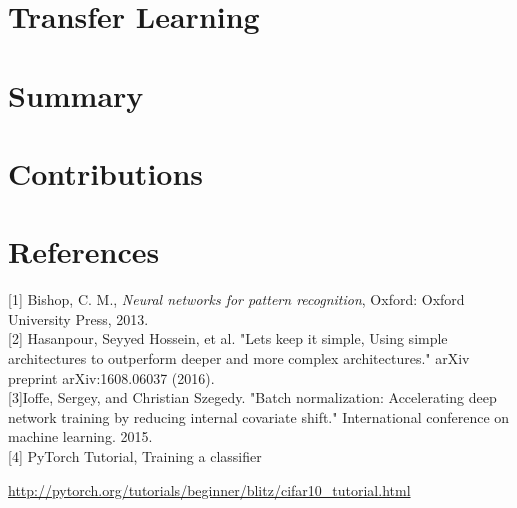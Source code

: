 \documentclass{article}
\begin{document}
\newpage
\section{Transfer Learning}

\newpage
\section{Summary}

\section{Contributions}



\section{References}
[1] Bishop, C. M., {\it Neural networks for pattern recognition}, Oxford: Oxford University Press, 2013. \\

[2] Hasanpour, Seyyed Hossein, et al. "Lets keep it simple, Using simple architectures to outperform deeper and more complex architectures." arXiv preprint arXiv:1608.06037 (2016). \\

[3]Ioffe, Sergey, and Christian Szegedy. "Batch normalization: Accelerating deep network training by reducing internal covariate shift." International conference on machine learning. 2015.\\

[4] PyTorch Tutorial, Training a classifier
 
 \url{http://pytorch.org/tutorials/beginner/blitz/cifar10_tutorial.html}
\end{document}
